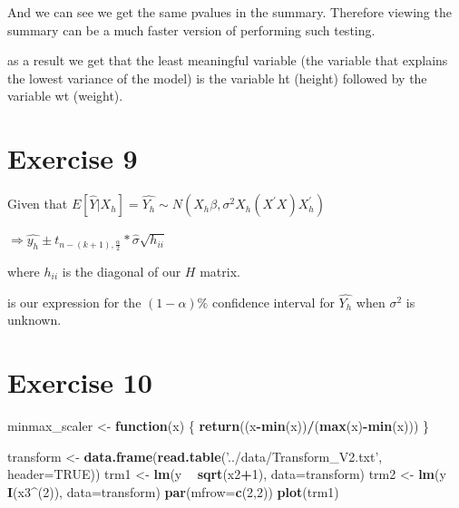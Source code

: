 \documentclass[]{article}
\newenvironment{Shaded}{\begin{snugshade}}{\end{snugshade}}
\newcommand{\ControlFlowTok}[1]{\textcolor[rgb]{0.13,0.29,0.53}{\textbf{#1}}}
\newcommand{\DataTypeTok}[1]{\textcolor[rgb]{0.13,0.29,0.53}{#1}}
\newcommand{\DecValTok}[1]{\textcolor[rgb]{0.00,0.00,0.81}{#1}}
\newcommand{\KeywordTok}[1]{\textcolor[rgb]{0.13,0.29,0.53}{\textbf{#1}}}
\newcommand{\NormalTok}[1]{#1}
\newcommand{\OperatorTok}[1]{\textcolor[rgb]{0.81,0.36,0.00}{\textbf{#1}}}
\newcommand{\OtherTok}[1]{\textcolor[rgb]{0.56,0.35,0.01}{#1}}
\newcommand{\StringTok}[1]{\textcolor[rgb]{0.31,0.60,0.02}{#1}}
\begin{document}
And we can see we get the same pvalues in the summary. Therefore viewing
the summary can be a much faster version of performing such testing.

as a result we get that the least meaningful variable (the variable that
explains the lowest variance of the model) is the variable ht (height)
followed by the variable wt (weight).

\newpage

\hypertarget{exercise-9}{%
\section{Exercise 9}\label{exercise-9}}

Given that
\(E[\hat{Y} | X_{h}] = \hat{Y_{h}} \sim N(X_{h} \beta, \sigma^{2} X_{h} (X^{\prime} X) X_{h}^{\prime})\)

\(\Rightarrow \hat{y_{h}} \pm t_{n - (k+1), \frac{\alpha}{2}} * \hat{\sigma} \sqrt{h_{ii}}\)

where \(h_{ii}\) is the diagonal of our \(H\) matrix.

is our expression for the \((1-\alpha)\%\) confidence interval for
\(\hat{Y_{h}}\) when \(\sigma^{2}\) is unknown.

\hypertarget{exercise-10}{%
\section{Exercise 10}\label{exercise-10}}

\begin{Shaded}
\begin{Highlighting}[]
\NormalTok{minmax_scaler <-}\StringTok{ }\ControlFlowTok{function}\NormalTok{(x) \{}
    \KeywordTok{return}\NormalTok{((x}\OperatorTok{-}\KeywordTok{min}\NormalTok{(x))}\OperatorTok{/}\NormalTok{(}\KeywordTok{max}\NormalTok{(x)}\OperatorTok{-}\KeywordTok{min}\NormalTok{(x)))}
\NormalTok{\}}
\end{Highlighting}
\end{Shaded}

\begin{Shaded}
\begin{Highlighting}[]
\NormalTok{transform <-}\StringTok{ }\KeywordTok{data.frame}\NormalTok{(}\KeywordTok{read.table}\NormalTok{(}\StringTok{'../data/Transform_V2.txt'}\NormalTok{, }\DataTypeTok{header=}\OtherTok{TRUE}\NormalTok{))}
\NormalTok{trm1 <-}\StringTok{ }\KeywordTok{lm}\NormalTok{(y }\OperatorTok{~}\StringTok{ }\KeywordTok{sqrt}\NormalTok{(x2}\OperatorTok{+}\DecValTok{1}\NormalTok{), }\DataTypeTok{data=}\NormalTok{transform)}
\NormalTok{trm2 <-}\StringTok{ }\KeywordTok{lm}\NormalTok{(y }\OperatorTok{~}\StringTok{ }\KeywordTok{I}\NormalTok{(x3}\OperatorTok{^}\NormalTok{(}\DecValTok{2}\NormalTok{)), }\DataTypeTok{data=}\NormalTok{transform)}
\KeywordTok{par}\NormalTok{(}\DataTypeTok{mfrow=}\KeywordTok{c}\NormalTok{(}\DecValTok{2}\NormalTok{,}\DecValTok{2}\NormalTok{))}
\KeywordTok{plot}\NormalTok{(trm1)}
\end{Highlighting}
\end{Shaded}
\end{document}
